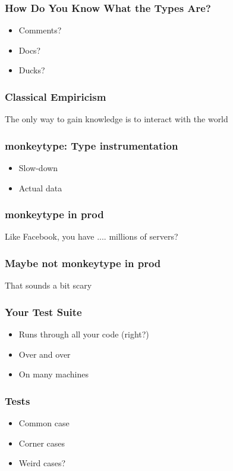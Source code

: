 \begin{frame}
\frametitle{How Do You Know What the Types Are?}

\begin{itemize}
\item Comments?
\item Docs?
\item Ducks?
\end{itemize}

\end{frame}

\begin{frame}
\frametitle{Classical Empiricism}

The only way to gain knowledge is to interact with the world

\end{frame}

\begin{frame}
\frametitle{monkeytype: Type instrumentation}

\begin{itemize}
\item Slow-down
\item Actual data
\end{itemize}
\end{frame}

\begin{frame}
\frametitle{monkeytype in prod}

Like Facebook, you have .... millions of servers?

\end{frame}

\begin{frame}
\frametitle{Maybe not monkeytype in prod}

That sounds a bit scary

\end{frame}

\begin{frame}
\frametitle{Your Test Suite}

\begin{itemize}
\item Runs through all your code (right?)
\item Over and over
\item On many machines
\end{itemize}

\end{frame}

\begin{frame}
\frametitle{Tests}
\begin{itemize}
\item Common case
\item Corner cases
\item Weird cases?
\end{itemize}
\end{frame}

